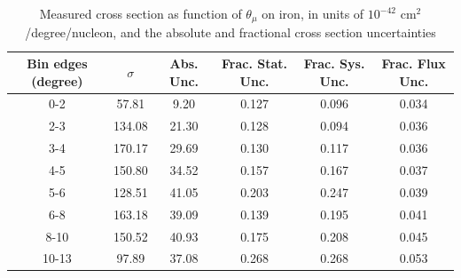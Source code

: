 \documentclass[../main.tex]{subfiles}
\begin{document}
\begin{table}
  \centering
  \renewcommand{\arraystretch}{1.15}
  \caption{Systematic covariance matrix of measured cross section in $p_{\mu}$ on iron, in units of $10^{-84}$ $(\text{cm}^2$/GeV/c/nucleon$)^2$}
  \label{tbl:sysnucleonnuc26muon_pc}
\end{table}
\pagebreak
\begin{turnpage}
\end{turnpage}
\begin{table}
  \centering
  \renewcommand{\arraystretch}{1.15}
  \caption{Measured cross section as function of $\theta_{\mu}$ on iron, in units of $10^{-42}$ $\text{cm}^2$/degree/nucleon, and the absolute and fractional cross section uncertainties}
    \begin{tabular}{c||c|c||c|c|c}
      Bin edges (degree) &  $\sigma$  &  Abs. Unc.  &  Frac. Stat. Unc.  &  Frac. Sys. Unc.  &  Frac. Flux Unc. \\
      \hline
      \hline
      0-2 & 57.81 & 9.20 & 0.127 & 0.096 & 0.034\\
      2-3 & 134.08 & 21.30 & 0.128 & 0.094 & 0.036\\
      3-4 & 170.17 & 29.69 & 0.130 & 0.117 & 0.036\\
      4-5 & 150.80 & 34.52 & 0.157 & 0.167 & 0.037\\
      5-6 & 128.51 & 41.05 & 0.203 & 0.247 & 0.039\\
      6-8 & 163.18 & 39.09 & 0.139 & 0.195 & 0.041\\
      8-10 & 150.52 & 40.93 & 0.175 & 0.208 & 0.045\\
      10-13 & 97.89 & 37.08 & 0.268 & 0.268 & 0.053
    \end{tabular}
  \label{tbl:datanucleonnuc26muon_thetaa}
\end{table}
\end{document}
